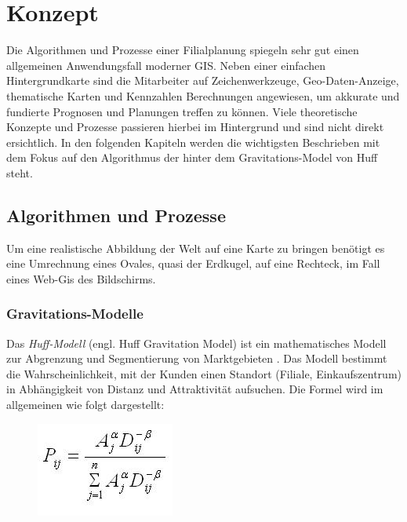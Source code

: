 \chapter{Konzept}
Die Algorithmen und Prozesse einer Filialplanung spiegeln sehr gut einen allgemeinen Anwendungsfall moderner GIS. 
Neben einer einfachen Hintergrundkarte sind die Mitarbeiter auf Zeichenwerkzeuge, Geo-Daten-Anzeige, thematische Karten und Kennzahlen Berechnungen angewiesen, um akkurate und fundierte Prognosen und Planungen treffen zu können.
Viele theoretische Konzepte und Prozesse passieren hierbei im Hintergrund und sind nicht direkt ersichtlich.
In den folgenden Kapiteln werden die wichtigsten Beschrieben mit dem Fokus auf den Algorithmus der hinter dem Gravitations-Model von Huff steht.
\section{Algorithmen und Prozesse}
Um eine realistische Abbildung der Welt auf eine Karte zu bringen benötigt es eine Umrechnung eines Ovales, quasi der Erdkugel, auf eine Rechteck, im Fall eines Web-Gis des Bildschirms. 
\subsection{Gravitations-Modelle}
Das \textit{Huff-Modell} (engl. Huff Gravitation Model) ist ein mathematisches Modell zur Abgrenzung und Segmentierung von Marktgebieten \cite{Roy2004}.
Das Modell bestimmt die Wahrscheinlichkeit, mit der Kunden einen Standort (Filiale, Einkaufszentrum) in Abhängigkeit von Distanz und Attraktivität aufsuchen. 
Die Formel wird im allgemeinen wie folgt dargestellt:

\begin{figure}
	\centering
	\includegraphics[]{resources/images/huff_model}
	\label{img:huff_formula}
\end{figure}

